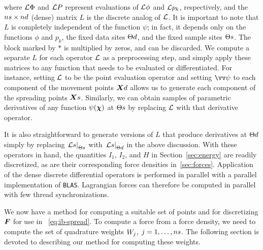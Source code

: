 where $\mathcal{L}\Phi$ and $\mathcal{L} P$ represent evaluations of $\mathcal{L}\phi$ and $\mathcal{L} p_k$, respectively, and the
$\sample\cardinality \times \data\cardinality$ (dense) matrix $L$ is the discrete analog of $\mathcal{L}$. It is important
to note that $L$ is completely independent of the function $\psi$; in fact, it depends only on the functions
$\phi$ and $p_k$, the fixed data sites $\data\sites$, and the fixed sample sites $\sample\sites$. The block marked
by $\ast$ is multiplied by zeros, and can be discarded. We compute a separate $L$ for each operator $\mathcal{L}$ as a
preprocessing step, and simply apply these matrices to any function that needs to be evaluated or differentiated.
For instance, setting $\mathcal{L}$ to be the point evaluation operator and setting $\arr{\psi}$ to each component of the
movement points $\data\X$ allows us to generate each component of the spreading points $\sample\X$.  Similarly, we
can obtain samples of parametric derivatives of any function $\psi(\boldsymbol{\chi})$ at $\sample\sites$ by replacing $\mathcal{L}$ with
that derivative operator.

It is also straightforward to generate versions of $L$ that produce derivatives at $\data\sites$ simply by
replacing $\left.\L s\right|_{\sample\sites}$ with $\left.\L s\right|_{\data\sites}$ in the above discussion. With
these operators in hand, the quantities $I_1$, $I_2$, and $H$ in Section~\ref{sec:energy} are readily discretized,
as are their corresponding force densities in~\ref{sec:forces}. Application of the dense discrete differential
operators is performed in parallel with a parallel implementation of \texttt{BLAS}. Lagrangian forces can
therefore be computed in parallel with few thread synchronizations.

We now have a method for computing a suitable set of points and for discretizing $\boldsymbol{F}$ for use in~%
\eqref{eq:ib-spread}. To compute a force from a force density, we need to compute the set of quadrature weights
$\weight[j]$, $j=1,\ldots,\sample\cardinality$. The following section is devoted to describing our method for
computing these weights.
